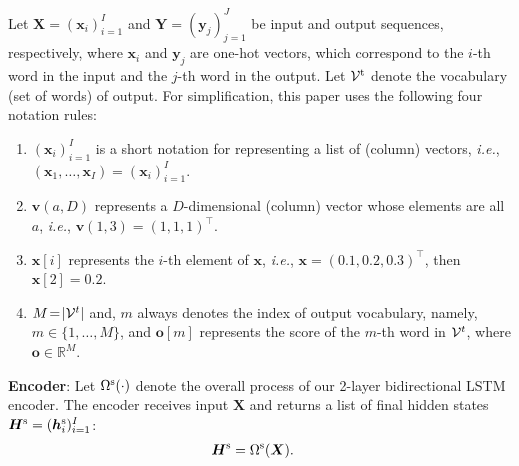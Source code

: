 \documentclass[11pt]{article}
\begin{document}
   Let ${\bm X}\!=\!({\bm x}_i)^{I}_{i=1}$ and ${\bm Y}\!=\!({\bm y}_j)^{J}_{j=1}$ be input and output sequences, respectively, where ${\bm x}_i$ and ${\bm y}_j$ are one-hot vectors, which correspond to the $i$-th word in the input and the $j$-th word in the output.
    Let ${\cal V}^{\rm t}$ denote the vocabulary (set of words) of output.
   For simplification, this paper uses the following four notation rules:
   \begin{enumerate}
    \item $({\bm x}_i)^{I}_{i=1}$ is a short notation for representing a list of (column) vectors, {\it i.e.}, $({\bm x}_1,\dots, {\bm x}_I)=({\bm x}_i)^{I}_{i=1}$.
    \item $\bm{v}(a,D)$ represents a $D$-dimensional (column) vector whose elements are all $a$, {\it i.e.}, $\bm{v}(1,3)=(1, 1, 1)^{\top}$.
    \item $\bm{x}[i]$ represents the $i$-th element of $\bm{x}$, {\it i.e.}, $\bm{x}=(0.1, 0.2, 0.3)^{\top}$, then $\bm{x}[2]=0.2$.
    \item $M\!=\!|{\cal V}^{t}|$ and, $m$ always denotes the index of output vocabulary, namely, $m\in\{1,\dots,M\}$, and $\bm{o}[m]$ represents the score of the $m$-th word in ${\cal V}^{t}$, where $\bm{o}\in\mathbb{R}^{M}$.
   \end{enumerate}
   
   {\bf Encoder}: Let $\Omega^{\rm s}(\cdot)$ denote the overall process of our 2-layer bidirectional LSTM encoder.
   The encoder receives input $\bm{X}$ and returns a list of final hidden states $\bm{H}^{\rm s}=(\bm{h}^{\rm s}_i)^{I}_{i=1}$:
\begin{align}
 \displaystyle
 \bm{H}^{\rm s}
 &=
 \Omega^{\rm s}(\bm{X})
.
 \label{eq:encoder_process}
\end{align}
%
\end{document}
